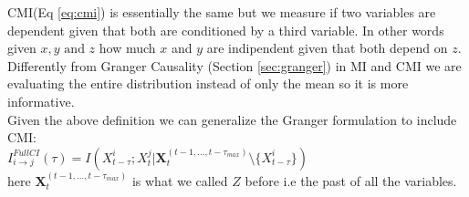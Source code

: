 CMI(Eq \ref{eq:cmi}) is essentially the same but we measure if two variables are dependent given that both are conditioned by a third variable.
In other words given $x,y \text{ and } z$ how much $x$ and $y$ are indipendent given that both depend on $z$.
Differently from Granger Causality (Section \ref{sec:granger}) in MI and CMI 
we are evaluating the entire distribution instead of only the mean so it is 
more informative.\\
Given the above definition we can generalize the Granger formulation to include CMI:\\
$I^{FullCI}_{i\rightarrow j}(\tau)=I(X^i_{t-\tau};X^j_t|\bm{X}_t^{(t-1,\ldots,t-\tau_{max})}\setminus\{X^i_{t-\tau}\})$ 
\\here $\bm{X}_t^{(t-1,\ldots,t-\tau_{max})}$ is what we called $Z$ before i.e the past of all the variables.\\

